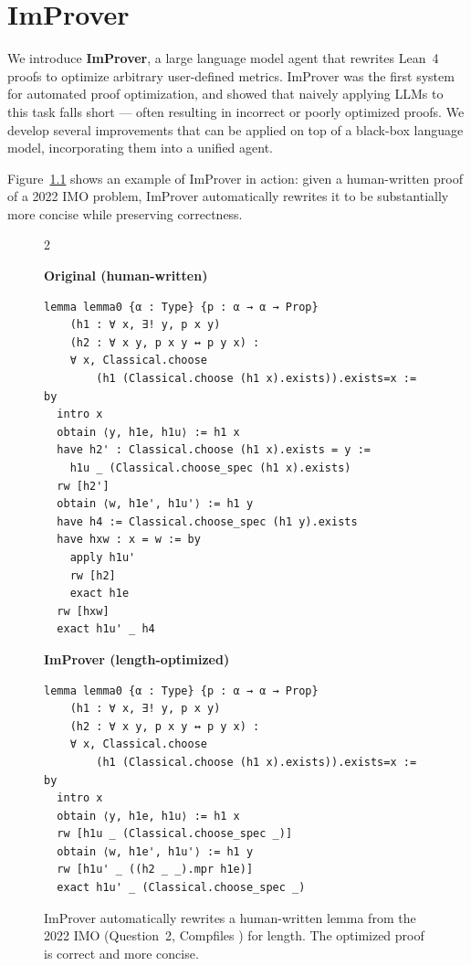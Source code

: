 \chapter{ImProver}\label{chap:improver}

We introduce \textbf{ImProver}, a large language model agent that rewrites Lean~4 proofs to optimize arbitrary user-defined metrics. ImProver was the first system for automated proof optimization, and showed that naively applying LLMs to this task falls short --- often resulting in incorrect or poorly optimized proofs. We develop several improvements that can be applied on top of a black-box language model, incorporating them into a unified agent.

Figure~\ref{fig:ex1-comp-len-ch} shows an example of ImProver in action: given a human-written proof of a 2022 IMO problem, ImProver automatically rewrites it to be substantially more concise while preserving correctness.

\setlength{\columnsep}{0.2cm}
\begin{figure}[ht]
\begin{multicols}{2}
{
\textbf{Original (human-written)}
\begin{lstlisting}[basicstyle=\scriptsize\ttfamily]
lemma lemma0 {α : Type} {p : α → α → Prop}
    (h1 : ∀ x, ∃! y, p x y)
    (h2 : ∀ x y, p x y ↔ p y x) :
    ∀ x, Classical.choose
        (h1 (Classical.choose (h1 x).exists)).exists=x := by
  intro x
  obtain ⟨y, h1e, h1u⟩ := h1 x
  have h2' : Classical.choose (h1 x).exists = y :=
    h1u _ (Classical.choose_spec (h1 x).exists)
  rw [h2']
  obtain ⟨w, h1e', h1u'⟩ := h1 y
  have h4 := Classical.choose_spec (h1 y).exists
  have hxw : x = w := by
    apply h1u'
    rw [h2]
    exact h1e
  rw [hxw]
  exact h1u' _ h4
\end{lstlisting}
}
\vfill\null
\columnbreak
{
\textbf{ImProver (length-optimized)}
\begin{lstlisting}[basicstyle=\scriptsize\ttfamily]
lemma lemma0 {α : Type} {p : α → α → Prop}
    (h1 : ∀ x, ∃! y, p x y)
    (h2 : ∀ x y, p x y ↔ p y x) :
    ∀ x, Classical.choose
        (h1 (Classical.choose (h1 x).exists)).exists=x := by
  intro x
  obtain ⟨y, h1e, h1u⟩ := h1 x
  rw [h1u _ (Classical.choose_spec _)]
  obtain ⟨w, h1e', h1u'⟩ := h1 y
  rw [h1u' _ ((h2 _ _).mpr h1e)]
  exact h1u' _ (Classical.choose_spec _)
\end{lstlisting}
}
\end{multicols}
\vspace{-1em}
\caption{ImProver automatically rewrites a human-written lemma from the 2022 IMO (Question~2, Compfiles \cite{compfiles}) for length. The optimized proof is correct and more concise.}
\label{fig:ex1-comp-len-ch}
\end{figure}

